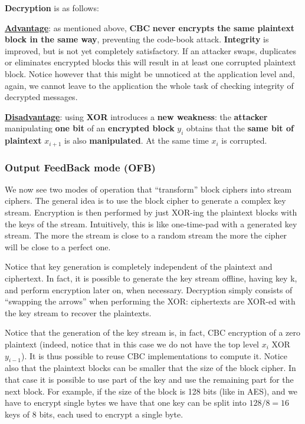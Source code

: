 
\textbf{Decryption} is as follows:


\underline{\textbf{Advantage}}: as mentioned above, \textbf{CBC} \textbf{never encrypts the same plaintext block in the same way}, preventing the code-book attack. \textbf{Integrity} is improved, but is not yet completely satisfactory. If an attacker swaps, duplicates or eliminates encrypted blocks this will result in at least one corrupted plaintext block. Notice however that this might be unnoticed at the application level and, again, we cannot leave to the application the whole task of checking integrity of decrypted messages.

\underline{\textbf{Disadvantage}}: using \textbf{XOR} introduces a \textbf{new weakness}: the \textbf{attacker} manipulating \textbf{one bit} of an \textbf{encrypted block} $y_i$ obtains that the \textbf{same bit of plaintext} $x_{i+1}$ is also \textbf{manipulated}. At the same time $x_i$ is corrupted.

\subsubsection{Output FeedBack mode (OFB)}
We now see two modes of operation that “transform” block ciphers into stream ciphers. The general idea is to use the block cipher to generate a complex key stream. Encryption is then performed by just XOR-ing the plaintext blocks with the keys of the stream. Intuitively, this is like one-time-pad with a generated key stream. The more the stream is close to a random stream the more the cipher will be close to a perfect one.


Notice that key generation is completely independent of the plaintext and ciphertext. In fact, it is possible to generate the key stream offline, having key k, and perform encryption later on, when necessary. Decryption simply consists of “swapping the arrows” when performing the XOR: ciphertexts are XOR-ed with the key stream to recover the plaintexts.


Notice that the generation of the key stream is, in fact, CBC encryption of a zero plaintext (indeed, notice that in this case we do not have the top level $x_i$ XOR $y_{i-1}$). It is thus possible to reuse CBC implementations to compute it. Notice also that the plaintext blocks can be smaller that the size of the block cipher. In that case it is possible to use part of the key and use the remaining part for the next block. For example, if the size of the block is 128 bits (like in AES), and we have to encrypt single bytes we have that one key can be split into $128/8 = 16$ keys of 8 bits, each used to encrypt a single byte.


